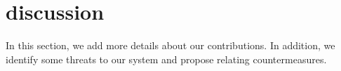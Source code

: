 \documentclass[conference]{IEEEtran}
\begin{document}
%
%
%
%
%
%
%
%


\section{discussion}
\label{discuss}
In this section, we add more details about our contributions. In addition, we identify some threats to our system and propose relating countermeasures.
\end{document}
